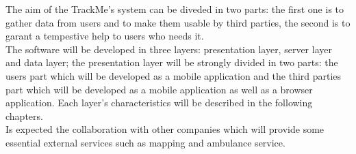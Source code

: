 The aim of the TrackMe's system can be diveded in two parts: the first one is to gather data from users and to make them usable by third parties, the second is to garant a tempestive help to users who needs it.\\
The software will be developed in three layers: presentation layer, server layer and data layer; the presentation layer will be strongly divided in two parts: the users part which will be developed as a mobile application and the third parties part which will be developed as a mobile application as well as a browser application. Each layer's characteristics will be described in the following chapters. \\
 Is expected the collaboration with other companies which will provide some essential external services such as mapping and ambulance service.